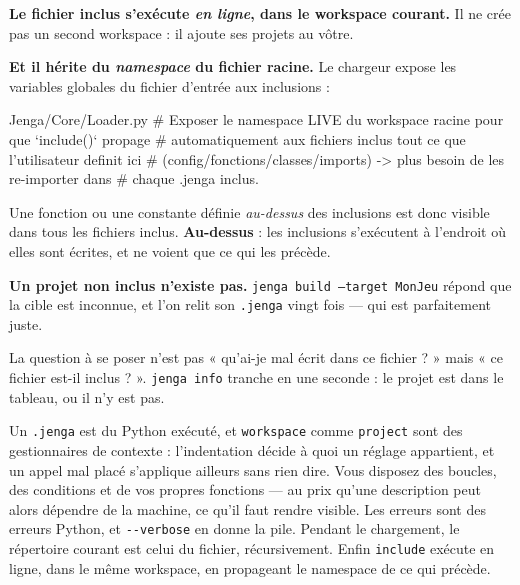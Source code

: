 \begin{nkretenir}
\textbf{Le fichier inclus s'exécute \emph{en ligne}, dans le workspace courant.}
Il ne crée pas un second workspace : il ajoute ses projets au vôtre.

\textbf{Et il hérite du \emph{namespace} du fichier racine.} Le chargeur expose
les variables globales du fichier d'entrée aux inclusions :

\begin{nkcode}{Jenga/Core/Loader.py}
# Exposer le namespace LIVE du workspace racine pour que `include()` propage
# automatiquement aux fichiers inclus tout ce que l'utilisateur definit ici
# (config/fonctions/classes/imports) -> plus besoin de les re-importer dans
# chaque .jenga inclus.
\end{nkcode}

Une fonction ou une constante définie \emph{au-dessus} des inclusions est donc
visible dans tous les fichiers inclus. \textbf{Au-dessus} : les inclusions
s'exécutent à l'endroit où elles sont écrites, et ne voient que ce qui les
précède.
\end{nkretenir}

\begin{nkpiege}
\textbf{Un projet non inclus n'existe pas.} \texttt{jenga build --target MonJeu}
répond que la cible est inconnue, et l'on relit son \texttt{.jenga} vingt fois ---
qui est parfaitement juste.

La question à se poser n'est pas « qu'ai-je mal écrit dans ce fichier ? » mais
« ce fichier est-il inclus ? ». \texttt{jenga info} tranche en une seconde : le
projet est dans le tableau, ou il n'y est pas.
\end{nkpiege}

\begin{nkbilan}
Un \texttt{.jenga} est du Python exécuté, et \texttt{workspace} comme
\texttt{project} sont des gestionnaires de contexte : l'indentation décide à
quoi un réglage appartient, et un appel mal placé s'applique ailleurs sans rien
dire. Vous disposez des boucles, des conditions et de vos propres fonctions ---
au prix qu'une description peut alors dépendre de la machine, ce qu'il faut
rendre visible. Les erreurs sont des erreurs Python, et \texttt{-{}-verbose} en
donne la pile. Pendant le chargement, le répertoire courant est celui du fichier,
récursivement. Enfin \texttt{include} exécute en ligne, dans le même workspace,
en propageant le namespace de ce qui précède.
\end{nkbilan}

